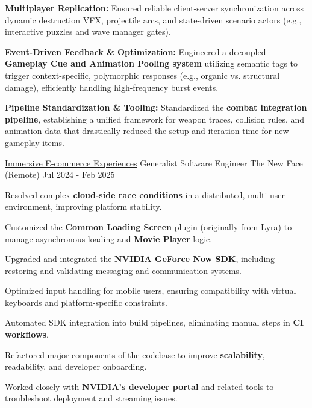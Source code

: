 \begin{cventries}
{\begin{cvitems}
        \item {\textbf{Multiplayer Replication:} Ensured reliable client-server synchronization across dynamic destruction VFX, projectile arcs, and state-driven scenario actors (e.g., interactive puzzles and wave manager gates).}
        \item {\textbf{Event-Driven Feedback \& Optimization:} Engineered a decoupled \textbf{Gameplay Cue and Animation Pooling system} utilizing semantic tags to trigger context-specific, polymorphic responses (e.g., organic vs. structural damage), efficiently handling high-frequency burst events.}
        \item {\textbf{Pipeline Standardization \& Tooling:} Standardized the \textbf{combat integration pipeline}, establishing a unified framework for weapon traces, collision rules, and animation data that drastically reduced the setup and iteration time for new gameplay items.}
      \end{cvitems}
    }

  \cventry
    {\href{https://www.thenewface.io/}{\underline{Immersive E-commerce Experiences}}}
    {Generalist Software Engineer}
    {The New Face (Remote)}
    {Jul 2024 - Feb 2025}
    {
      \begin{cvitems}
        \item {Resolved complex \textbf{cloud-side race conditions} in a distributed, multi-user environment, improving platform stability.}
        \item {Customized the \textbf{Common Loading Screen} plugin (originally from Lyra) to manage asynchronous loading and \textbf{Movie Player} logic.}
        \item {Upgraded and integrated the \textbf{NVIDIA GeForce Now SDK}, including restoring and validating messaging and communication systems.}
        \item {Optimized input handling for mobile users, ensuring compatibility with virtual keyboards and platform-specific constraints.}
        \item {Automated SDK integration into build pipelines, eliminating manual steps in \textbf{CI workflows}.}
        \item {Refactored major components of the codebase to improve \textbf{scalability}, readability, and developer onboarding.}
        \item {Worked closely with \textbf{NVIDIA's developer portal} and related tools to troubleshoot deployment and streaming issues.}
      \end{cvitems}
    }


\end{cventries}
